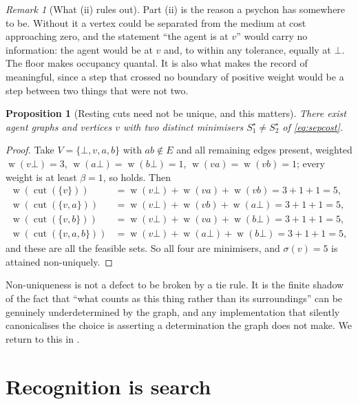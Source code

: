 \documentclass[11pt,a4paper]{article}
\theoremstyle{clstyle}
\newtheorem{proposition}[theorem]{Proposition}
\theoremstyle{definition}
\theoremstyle{remark}
\newtheorem{remark}[theorem]{Remark}
\DeclareMathOperator{\wt}{w}
\DeclareMathOperator{\cut}{cut}
\newcommand{\sep}{\sigma}
\newcommand{\flo}{\beta}
\newcommand{\med}{\bot}                  %
\begin{document}
\begin{remark}[What (ii) rules out]
\label{rem:noinfinitesimal}
Part (ii) is the reason a psychon has somewhere to be. Without it a vertex
could be separated from the medium at cost approaching zero, and the
statement ``the agent is at $v$'' would carry no information: the agent
would be at $v$ and, to within any tolerance, equally at $\med$. The floor
makes occupancy quantal. It is also what makes the record of
 meaningful, since a step that crossed no boundary of
positive weight would be a step between two things that were not two.
\end{remark}

\begin{proposition}[Resting cuts need not be unique, and this matters]
\label{prop:nonunique}
There exist agent graphs and vertices $v$ with two distinct minimisers
$S_1^{\star}\neq S_2^{\star}$ of \eqref{eq:sepcost}.
\end{proposition}

\begin{proof}
Take $V=\{\med,v,a,b\}$ with $ab\notin E$ and all remaining edges present,
weighted $\wt(v\med)=3$, $\wt(a\med)=\wt(b\med)=1$, $\wt(va)=\wt(vb)=1$;
every weight is at least $\flo=1$, so  holds. Then
\begin{align*}
\wt(\cut(\{v\}))      &= \wt(v\med)+\wt(va)+\wt(vb) = 3+1+1 = 5,\\
\wt(\cut(\{v,a\}))    &= \wt(v\med)+\wt(vb)+\wt(a\med) = 3+1+1 = 5,\\
\wt(\cut(\{v,b\}))    &= \wt(v\med)+\wt(va)+\wt(b\med) = 3+1+1 = 5,\\
\wt(\cut(\{v,a,b\}))  &= \wt(v\med)+\wt(a\med)+\wt(b\med) = 3+1+1 = 5,
\end{align*}
and these are all the feasible sets. So all four are minimisers, and
$\sep(v)=5$ is attained non-uniquely.
\end{proof}

Non-uniqueness is not a defect to be broken by a tie rule. It is the finite
shadow of the fact that ``what counts as this thing rather than its
surroundings'' can be genuinely underdetermined by the graph, and any
implementation that silently canonicalises the choice is asserting a
determination the graph does not make. We return to this in
.

\section{Recognition is search}
\label{sec:recognition}
\end{document}
